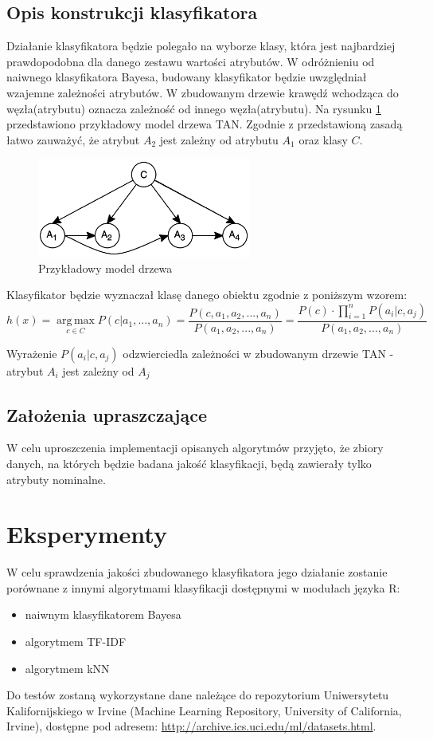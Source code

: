 \documentclass[paper=a4, fontsize=11pt]{scrartcl} %
\numberwithin{equation}{section} %
\numberwithin{figure}{section} %
\numberwithin{table}{section} %
\begin{document}
\subsection{Opis konstrukcji klasyfikatora}
Działanie klasyfikatora będzie polegało na wyborze klasy, która jest najbardziej prawdopodobna dla danego zestawu wartości atrybutów. W odróżnieniu od  naiwnego klasyfikatora Bayesa, budowany klasyfikator będzie uwzględniał wzajemne zależności atrybutów. W zbudowanym drzewie krawędź wchodząca do węzła(atrybutu) oznacza zależność od innego węzła(atrybutu). Na rysunku \ref{fig:model_drzewa} przedstawiono przykładowy model drzewa TAN. Zgodnie z przedstawioną zasadą łatwo zauważyć, że atrybut $A_2$ jest zależny od atrybutu $A_1$ oraz klasy $C$.
\begin{figure}[h]
 \centering
 \includegraphics[width=70mm]{model1.png}
 \caption{Przykładowy model drzewa}
 \label{fig:model_drzewa}
\end{figure}

Klasyfikator będzie wyznaczał klasę danego obiektu zgodnie z poniższym wzorem:
\[h(x) = \operatorname*{arg\,max}_{c \in C} P(c|a_1,...,a_n)= \frac{P(c,a_1,a_2,...,a_n)}{P(a_1,a_2,...,a_n)}= 
\frac {P(c) \cdot \prod_{i=1}^{n} {P(a_i|c,a_j)}}{P(a_1,a_2,...,a_n)} \]

Wyrażenie $P(a_i|c,a_j)$ odzwierciedla zależności w zbudowanym drzewie TAN - atrybut $A_i$ jest zależny od $A_j$

\subsection{Założenia upraszczające}

W celu uproszczenia implementacji opisanych algorytmów przyjęto, że zbiory danych, na których będzie badana jakość klasyfikacji, będą zawierały tylko atrybuty nominalne.

    

\section{Eksperymenty}   
W celu sprawdzenia jakości zbudowanego klasyfikatora jego działanie zostanie porównane z innymi algorytmami klasyfikacji dostępnymi w modułach języka R: \\
\begin{itemize}
\item naiwnym klasyfikatorem Bayesa
\item algorytmem TF-IDF
\item algorytmem kNN
\end{itemize}
Do testów zostaną wykorzystane dane należące do repozytorium Uniwersytetu Kalifornijskiego w Irvine (Machine Learning Repository, University of California, Irvine), dostępne pod adresem: \url{http://archive.ics.uci.edu/ml/datasets.html}.

\nocite{Bayesian_Network_Classifiers}

\nocite{*}

 
\end{document}
